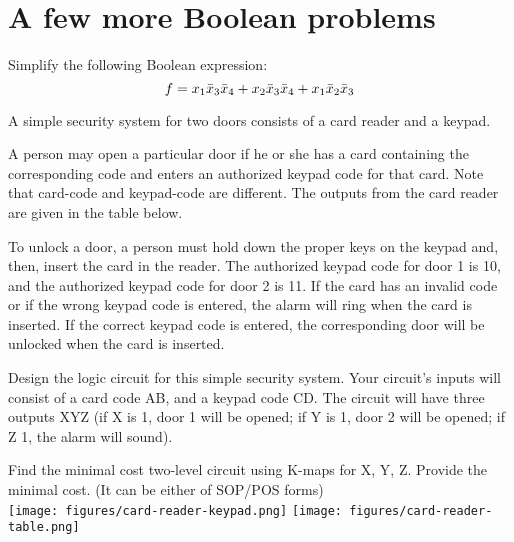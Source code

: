 
\section{A few more Boolean problems}
\begin{example}
  Simplify the following Boolean expression:
  \[ f = x_1\bar{x}_3 \bar{x}_4 + x_2 \bar{x}_3 \bar{x}_4 + x_1 \bar{x}_2 \bar{x}_3 \]
\end{example}



\begin{prob}[20 marks]
A simple security system for two doors consists of a card reader and a keypad.

A person may open a particular door if he or she has a card containing the corresponding code and enters an authorized keypad code for that card. Note that card-code and keypad-code are different. The outputs from the card reader are given in the table below.


To unlock a door, a person must hold down the proper keys on the keypad and, then, insert the card in the reader. The authorized keypad code for door 1 is 10, and the authorized keypad code for door 2 is 11. If the card has an invalid code or if the wrong keypad code is entered, the alarm will ring when the card is inserted. If the correct keypad code is entered, the corresponding door will be unlocked when the card is inserted.

Design the logic circuit for this simple security system. Your circuit’s inputs will consist of a card code AB, and a keypad code CD. The circuit will have three outputs
XYZ (if X is 1, door 1 will be opened; if Y is 1, door 2 will be opened; if Z  1, the alarm will sound).

Find the minimal cost two-level circuit using K-maps for X, Y, Z. Provide the minimal cost. (It can be either of SOP/POS forms)\\
\texttt{[image: figures/card-reader-keypad.png]}%
\texttt{[image: figures/card-reader-table.png]}
\end{prob}
